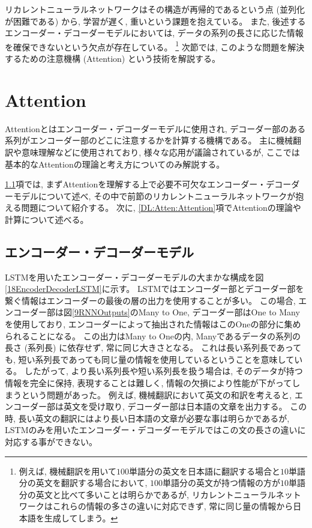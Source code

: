 リカレントニューラルネットワークはその構造が再帰的であるという点 (並列化が困難である) から, 学習が遅く, 重いという課題を抱えている。
また, 後述するエンコーダー・デコーダーモデルにおいては, データの系列の長さに応じた情報を確保できないという欠点が存在している。
\footnote{例えば, 機械翻訳を用いて$100$単語分の英文を日本語に翻訳する場合と$10$単語分の英文を翻訳する場合において, $100$単語分の英文が持つ情報の方が$10$単語分の英文と比べて多いことは明らかであるが, リカレントニューラルネットワークはこれらの情報の多さの違いに対応できず, 常に同じ量の情報から日本語を生成してしまう。}
次節では, このような問題を解決するための注意機構 (Attention) という技術を解説する。


\section{Attention} \label{DL:Attention}

Attention\cite{BahdanauAttention, LuongAttention}とはエンコーダー・デコーダーモデルに使用され, デコーダー部のある系列がエンコーダー部のどこに注意するかを計算する機構である。
主に機械翻訳や意味理解などに使用されており, 様々な応用が議論されているが, ここでは基本的なAttentionの理論と考え方についてのみ解説する。

\ref{DL:Atten:EncoderDecoderModel}項では, まずAttentionを理解する上で必要不可欠なエンコーダー・デコーダーモデルについて述べ, その中で前節のリカレントニューラルネットワークが抱える問題について紹介する。
次に, \ref{DL:Atten:Attention}項でAttentionの理論や計算について述べる。


\subsection{エンコーダー・デコーダーモデル} \label{DL:Atten:EncoderDecoderModel}

LSTMを用いたエンコーダー・デコーダーモデルの大まかな構成を図\ref{18EncoderDecoderLSTM}に示す。
LSTMではエンコーダー部とデコーダー部を繋ぐ情報はエンコーダーの最後の層の出力を使用することが多い。
この場合, エンコーダー部は図\ref{9RNNOutputs}のMany to One, デコーダー部はOne to Manyを使用しており, エンコーダーによって抽出された情報はこのOneの部分に集められることになる。
この出力はMany to Oneの内, Manyであるデータの系列の長さ (系列長) に依存せず, 常に同じ大きさとなる。
これは長い系列長であっても, 短い系列長であっても同じ量の情報を使用しているということを意味している。
したがって, より長い系列長や短い系列長を扱う場合は, そのデータが持つ情報を完全に保持, 表現することは難しく, 情報の欠損により性能が下がってしまうという問題があった。
例えば, 機械翻訳において英文の和訳を考えると, エンコーダー部は英文を受け取り, デコーダー部は日本語の文章を出力する。
この時, 長い英文の翻訳にはより長い日本語の文章が必要な事は明らかであるが, LSTMのみを用いたエンコーダー・デコーダーモデルではこの文の長さの違いに対応する事ができない。

